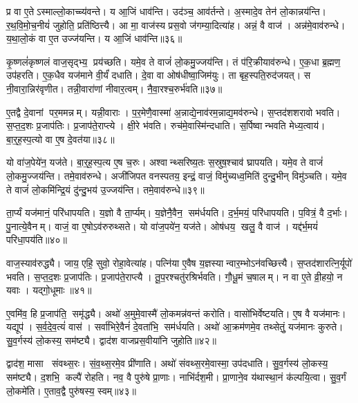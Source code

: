 प्र वा ए॒तेऽस्माल्लो॒काच्च्य॑वन्ते। य आ॒जिं धाव॑न्ति। उद॑ञ्च॒ आव॑र्तन्ते। अ॒स्मादे॒व तेन॑ लो॒कान्नय॑न्ति। र॒थ॒वि॒मो॒च॒नीयं॑ जुहोति॒ प्रति॑ष्ठित्त्यै। आ मा॒ वाज॑स्य प्रस॒वो ज॑गम्या॒दित्या॑ह। अन्नं॒ वै वाज॑। अन्न॑मे॒वाव॑रुन्धे। य॒था॒लो॒कं वा ए॒त उज्ज॑यन्ति। य आ॒जिं धाव॑न्ति॥३६॥

कृ॒ष्णलं॑कृष्णलं वाज॒सृद्भ्य॒ प्रय॑च्छति। यमे॒व ते वाजं॑ लो॒कमु॒ज्जय॑न्ति। तं प॑रि॒क्रीयाव॑रुन्धे। ए॒क॒धा ब्र॒ह्मण॒ उप॑हरति। ए॒क॒धैव यज॑माने वी॒र्यं॑ दधाति। दे॒वा वा ओष॑धीष्वा॒जिम॑युः। ता बृह॒स्पति॒रुद॑जयत्। स नी॒वारा॒न्निर॑वृणीत। तन्नी॒वारा॑णां नीवार॒त्वम्। नै॒वा॒रश्च॒रुर्भ॑वति॥३७॥

ए॒तद्वै दे॒वानां पर॒ममन्नम्। यन्नी॒वाराः। प॒र॒मेणै॒वास्मा॑ अ॒न्नाद्ये॒नाव॑रम॒न्नाद्य॒मव॑रुन्धे। स॒प्तद॑शशरावो भवति। स॒प्त॒द॒शः प्र॒जाप॑तिः। प्र॒जाप॑ते॒राप्त्ये। क्षी॒रे भ॑वति। रुच॑मे॒वास्मि॑न्दधाति। स॒र्पिष्वान्भवति मेध्य॒त्वाय॑। बा॒र्॒ह॒स्प॒त्यो वा ए॒ष दे॒वत॑या॥३८॥

यो वा॑ज॒पेये॑न॒ यज॑ते। बा॒र्॒ह॒स्प॒त्य ए॒ष च॒रुः। अश्वान्थ्सरिष्य॒तः स॒स्रुष॒श्चाव॑ घ्रापयति। यमे॒व ते वाजं॑ लो॒कमु॒ज्जय॑न्ति। तमे॒वाव॑रुन्धे। अजी॑जिपत वनस्पतय॒ इन्द्रं॒ वाजं॒ विमु॑च्यध्व॒मिति॑ दुन्दु॒भीन् विमु॑ञ्चति। यमे॒व ते वाजं॑ लो॒कमि॑न्द्रि॒यं दु॑न्दु॒भय॑ उ॒ज्जय॑न्ति। तमे॒वाव॑रुन्धे॥३९॥

ता॒र्प्यं यज॑मानं॒ परि॑धापयति। य॒ज्ञो वै ता॒र्प्यम्। य॒ज्ञेनै॒वैन॒ सम॑र्धयति। द॒र्भ॒मयं॒ परि॑धापयति। प॒वित्रं॒ वै द॒र्भाः। पु॒नात्ये॒वैनम्। वाजं॒ वा ए॒षोऽव॑रुरुथ्सते। यो वा॑ज॒पये॑न॒ यज॑ते। ओष॑धय॒ खलु॒ वै वाज॑। यद्द॑र्भ॒मयं॑ परिधा॒पय॑ति॥४०॥

वाज॒स्याव॑रुद्ध्यै। जाय॒ एहि॒ सुवो॒ रोहा॒वेत्या॑ह। पत्नि॑या ए॒वैष य॒ज्ञस्यान्वार॒म्भोऽन॑वच्छित्त्यै। स॒प्तद॑शारत्नि॒र्यूपो॑ भवति। स॒प्त॒द॒शः प्र॒जाप॑तिः। प्र॒जाप॑ते॒राप्त्यै। तू॒प॒रश्चतु॑रश्रिर्भवति। गौ॒धू॒मं च॒षालम्। न वा ए॒ते व्री॒हयो॒ न यवाः। यद्गो॒धूमाः॥४१॥

ए॒वमि॑व॒ हि प्र॒जाप॑ति॒ समृ॑द्ध्यै। अथो॑ अ॒मुमे॒वास्मै॑ लो॒कमन्न॑वन्तं करोति। वासो॑भिर्वेष्टयति। ए॒ष वै यज॑मानः। यद्यूप॑। स॒र्व॒दे॒व॒त्यं॑ वास॑। सर्वा॑भिरे॒वैनं॑ दे॒वता॑भि॒ सम॑र्धयति। अथो॑ आ॒क्रम॑णमे॒व तथ्सेतुं॒ यज॑मानः कुरुते। सु॒व॒र्गस्य॑ लो॒कस्य॒ सम॑ष्ट्यै। द्वाद॑श वाजप्रस॒वीया॑नि जुहोति॥४२॥

द्वाद॑श॒ मासा संवथ्स॒रः। सं॒व॒थ्स॒रमे॒व प्री॑णाति। अथो॑ संवथ्स॒रमे॒वास्मा॒ उप॑दधाति। सु॒व॒र्गस्य॑ लो॒कस्य॒ सम॑ष्ट्यै। द॒शभि॒ कल्पै॑ रोहति। नव॒ वै पुरु॑षे प्रा॒णाः। नाभि॑र्दश॒मी। प्रा॒णाने॒व य॑थास्था॒नं क॑ल्पयि॒त्वा। सु॒व॒र्गं लो॒कमे॑ति। ए॒ताव॒द्वै पुरु॑षस्य॒ स्वम्॥४३॥

